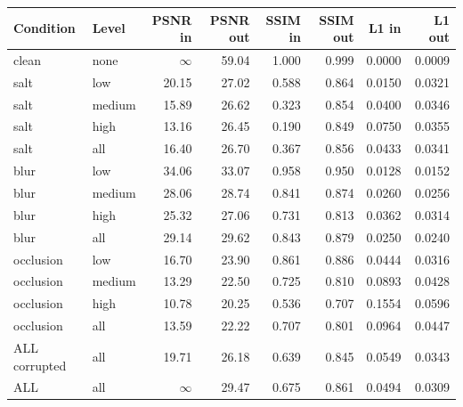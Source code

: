 \begin{tabular}{llrrrrrr}
\hline
Condition & Level & PSNR in & PSNR out & SSIM in & SSIM out & L1 in & L1 out \\
\hline
clean & none & $\infty$ & 59.04 & 1.000 & 0.999 & 0.0000 & 0.0009 \\
salt & low & 20.15 & 27.02 & 0.588 & 0.864 & 0.0150 & 0.0321 \\
salt & medium & 15.89 & 26.62 & 0.323 & 0.854 & 0.0400 & 0.0346 \\
salt & high & 13.16 & 26.45 & 0.190 & 0.849 & 0.0750 & 0.0355 \\
salt & all & 16.40 & 26.70 & 0.367 & 0.856 & 0.0433 & 0.0341 \\
blur & low & 34.06 & 33.07 & 0.958 & 0.950 & 0.0128 & 0.0152 \\
blur & medium & 28.06 & 28.74 & 0.841 & 0.874 & 0.0260 & 0.0256 \\
blur & high & 25.32 & 27.06 & 0.731 & 0.813 & 0.0362 & 0.0314 \\
blur & all & 29.14 & 29.62 & 0.843 & 0.879 & 0.0250 & 0.0240 \\
occlusion & low & 16.70 & 23.90 & 0.861 & 0.886 & 0.0444 & 0.0316 \\
occlusion & medium & 13.29 & 22.50 & 0.725 & 0.810 & 0.0893 & 0.0428 \\
occlusion & high & 10.78 & 20.25 & 0.536 & 0.707 & 0.1554 & 0.0596 \\
occlusion & all & 13.59 & 22.22 & 0.707 & 0.801 & 0.0964 & 0.0447 \\
ALL corrupted & all & 19.71 & 26.18 & 0.639 & 0.845 & 0.0549 & 0.0343 \\
ALL & all & $\infty$ & 29.47 & 0.675 & 0.861 & 0.0494 & 0.0309 \\
\hline
\end{tabular}
